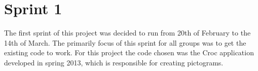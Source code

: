 \chapter{Sprint 1}
The first sprint of this project was decided to run from 20th of February to the 14th of March.
The primarily focus of this sprint for all groups was to get the existing code to work.
For this project the code chosen was the Croc application developed in spring 2013, which is responsible for creating pictograms.

